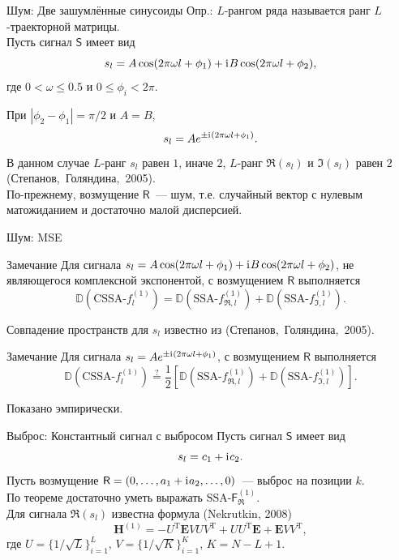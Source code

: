 \documentclass[ucs, notheorems, handout]{beamer}
\newcommand{\tX}[1]{\mathsf{#1}}
\newcommand{\iu}{\mathrm{i}\mkern1mu}
\begin{document}
\begin{frame}{Шум: Две зашумлённые синусоиды}
\alert{Опр.:} $L$-рангом ряда называется ранг $L$-траекторной матрицы.\\
\vspace{1em}
Пусть сигнал $\tX{S}$ имеет вид
\begin{equation*}
\label{eq:general_ts}
s_l = A\cos(2 \pi\omega l + \phi_1) + \iu B\cos(2 \pi\omega l + \phi_2),
\end{equation*}
где $0<\omega\le 0.5$ и $0\le\phi_i < 2\pi$.

При $|\phi_2-\phi_1| = \pi/2$ и $A=B$,
$$s_l = Ae^{\pm \iu(2 \pi\omega l + \phi_1)}.$$
В данном случае $L$-ранг $s_l$ равен $1$, иначе $2$, $L$-ранг $\Re(s_l)$ и $\Im(s_l)$ равен $2$ (Степанов,~Голяндина,~2005).\\
\vspace{1em}
По-прежнему, возмущение $\tX{R}$~--- шум, т.е. случайный вектор с нулевым матожиданием и достаточно малой дисперсией.
\end{frame}

\begin{frame}{Шум: MSE}
\begin{block}{Замечание}
    Для сигнала $s_l = A\cos(2 \pi\omega l + \phi_1) + \iu B\cos(2 \pi\omega l + \phi_2)$, не являющегося комплексной экспонентой, с возмущением $\tX{R}$ выполняется
    $$\mathbb{D}(\text{CSSA-}f^{(1)}_l) = \mathbb{D}(\text{SSA-}f^{(1)}_{\Re, l}) + \mathbb{D}(\text{SSA-}f^{(1)}_{\Im, l}).$$
\end{block}

Совпадение пространств для $s_l$ известно из (Степанов,~Голяндина,~2005).

\begin{block}{Замечание}
    Для сигнала $s_l = Ae^{\pm \iu(2 \pi\omega l + \phi_1)}$, с возмущением $\tX{R}$ выполняется
    $$\mathbb{D}(\text{CSSA-}f^{(1)}_l) \stackrel{?}{=} \frac{1}{2}[\mathbb{D}(\text{SSA-}f^{(1)}_{\Re, l}) + \mathbb{D}(\text{SSA-}f^{(1)}_{\Im, l})].$$
\end{block}
Показано эмпирически.
\end{frame}

\begin{frame}{Выброс: Константный сигнал с выбросом}
Пусть сигнал $\tX{S}$ имеет вид
$$s_l = c_1 + \iu c_2.$$
Пусть возмущение $\tX{R} = (0, \ldots, a_1 + \iu a_2, \ldots, 0)$~--- выброс на позиции $k$.\\
\vspace{1em}
По теореме достаточно уметь выражать $\text{SSA-}\tX{F}^{(1)}_{\Re}$.\\
\vspace{1em}
Для сигнала $\Re(s_l)$ известна формула (Nekrutkin, 2008)
$$\mathbf{H}^{(1)} = -U^{\mathrm{T}} \mathbf{E} V U V^{\mathrm{T}} + U U^{\mathrm{T}} \mathbf{E} + \mathbf{E} V V^{\mathrm{T}},$$
где $U = \{1/\sqrt{L}\}^{L}_{i = 1},\, V = \{1/\sqrt{K}\}^{K}_{i = 1}$, $K = N - L + 1$.
\end{frame}
\end{document}
